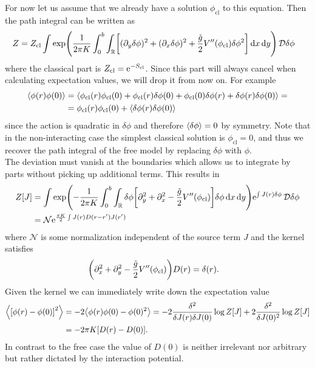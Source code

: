 \documentclass[english, parskip=full]{scrartcl}
\begin{document}
For now let us assume that we already have a solution $\phi_\text{cl}$ to this equation.
Then the path integral can be written as
\begin{align}
Z &= Z_\text{cl} \int \exp\kla*{\frac{1}{2\pi K} \intx{0}{b}{\intr{\klb*{(\partial_y\delta\phi)^2 + (\partial_x\delta\phi)^2 + \frac{\tilde{g}}{2} V''(\phi_\text{cl}) \delta\phi^2}}{x} }{y}}\,\mathcal{D}\delta\phi
\end{align}
where the classical part is $Z_\text{cl} = \powe{-S_\text{cl}}$.
Since this part will always cancel when calculating expectation values, we will drop it from now on.
For example
\begin{align}
\bra*{\phi(r)\phi(0)} &= \bra*{\phi_\text{cl}(r)\phi_\text{cl}(0) + \phi_\text{cl}(r)\delta\phi(0) + \phi_\text{cl}(0)\delta\phi(r) + \delta\phi(r)\delta\phi(0)} = \\
&= \phi_\text{cl}(r)\phi_\text{cl}(0) + \bra*{\delta\phi(r)\delta\phi(0)}
\end{align}
since the action is quadratic in $\delta\phi$ and therefore $\bra*{\delta\phi} = 0$ by symmetry.
Note that in the non-interacting case the simplest classical solution is $\phi_\text{cl}=0$, and thus we recover the path integral of the free model by replacing $\delta\phi$ with $\phi$.\\
The deviation must vanish at the boundaries which allows us to integrate by parts without picking up additional terms.
This results in
\begin{align}
Z[J] &= \int \exp\kla*{-\frac{1}{2\pi K} \intx{0}{b}{\intr{\delta\phi \klb*{\partial_y^2 + \partial_x^2 - \frac{\tilde{g}}{2} V''(\phi_\text{cl})} \delta\phi}{x} }{y}} \powe{\int J(r)\delta\phi}\,\mathcal{D}\delta\phi\\
&= \mathcal{N} \powe{\frac{\pi K}{2} \int J(r)D(r-r')J(r')}
\end{align}
where $\mathcal{N}$ is some normalization independent of the source term $J$ and the kernel satisfies
\begin{align}
\kla*{\partial_x^2 + \partial_y^2 - \frac{\tilde{g}}{2} V''(\phi_\text{cl})} D(r) &= \delta(r).
\end{align}
Given the kernel we can immediately write down the expectation value
\begin{align}
\bra*{\klb*{\phi(r) - \phi(0)}^2} &= -2\bra*{\phi(r)\phi(0) - \phi(0)^2} = -2\frac{\delta^2}{\delta J(r)\delta J(0)} \log Z[J] + 2\frac{\delta^2}{\delta J(0)^2}\log Z[J] \\
&= -2\pi K\klb*{D(r) - D(0)}.
\end{align}
In contrast to the free case the value of $D(0)$ is neither irrelevant nor arbitrary but rather dictated by the interaction potential.
\end{document}
